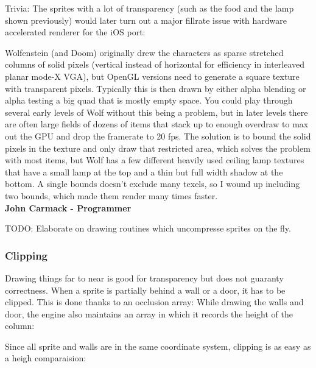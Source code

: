 \par

Trivia: The sprites with a lot of transparency (such as the food and the lamp shown previously) would later turn out a major fillrate issue with hardware accelerated renderer for the iOS port:

\begin{fancyquotes}
Wolfenstein (and Doom) originally drew the characters as sparse stretched columns of solid pixels (vertical instead of horizontal for efficiency in interleaved planar mode-X VGA), but OpenGL versions need to generate a square texture with transparent pixels.  Typically this is then drawn by either alpha blending or alpha testing a big quad that is mostly empty space.  You could play through several early levels of Wolf without this being a problem, but in later levels there are often large fields of dozens of items that stack up to enough overdraw to max out the GPU and drop the framerate to 20 fps.  The solution is to bound the solid pixels in the texture and only draw that restricted area, which solves the problem with most items, but Wolf has a few different heavily used ceiling lamp textures that have a small lamp at the top and a thin but full width shadow at the bottom.  A single bounds doesn't exclude many texels, so I wound up including two bounds, which made them render many times faster. 
\bigskip \\
\textbf{John Carmack - Programmer}
 \end{fancyquotes}

TODO: Elaborate on drawing routines which uncompresse sprites on the fly.


\subsubsection{Clipping}
Drawing things far to near is good for transparency but does not guaranty correctness. When a sprite is partially behind a wall or a door, it has to be clipped. This is done thanks to an occlusion array: While drawing the walls and door, the engine also maintains an array in which it records the height of the column:\\
\par
\begin{minipage}{\textwidth}

\end{minipage}
\par
Since all sprite and walls are in the same coordinate system, clipping is as easy as a heigh comparaision:\\
















